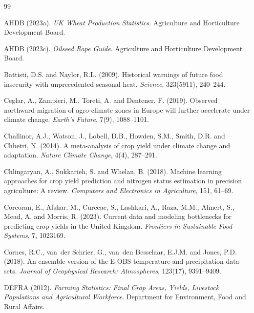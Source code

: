 \documentclass[12pt,a4paper]{report}
\begin{document}
\begin{thebibliography}{99}

AHDB (2023a).
\newblock \emph{UK Wheat Production Statistics}.
\newblock Agriculture and Horticulture Development Board.

AHDB (2023c).
\newblock \emph{Oilseed Rape Guide}.
\newblock Agriculture and Horticulture Development Board.

Battisti, D.S. and Naylor, R.L. (2009).
\newblock Historical warnings of future food insecurity with unprecedented seasonal heat.
\newblock \emph{Science}, 323(5911), 240--244.

Ceglar, A., Zampieri, M., Toreti, A. and Dentener, F. (2019).
\newblock Observed northward migration of agro-climate zones in Europe will further accelerate under climate change.
\newblock \emph{Earth's Future}, 7(9), 1088--1101.

Challinor, A.J., Watson, J., Lobell, D.B., Howden, S.M., Smith, D.R. and Chhetri, N. (2014).
\newblock A meta-analysis of crop yield under climate change and adaptation.
\newblock \emph{Nature Climate Change}, 4(4), 287--291.

Chlingaryan, A., Sukkarieh, S. and Whelan, B. (2018).
\newblock Machine learning approaches for crop yield prediction and nitrogen status estimation in precision agriculture: A review.
\newblock \emph{Computers and Electronics in Agriculture}, 151, 61--69.

Corcoran, E., Afshar, M., Curceac, S., Lashkari, A., Raza, M.M., Ahnert, S., Mead, A. and Morris, R. (2023).
\newblock Current data and modeling bottlenecks for predicting crop yields in the United Kingdom.
\newblock \emph{Frontiers in Sustainable Food Systems}, 7, 1023169.

Cornes, R.C., van~der Schrier, G., van~den Besselaar, E.J.M. and Jones, P.D. (2018).
\newblock An ensemble version of the E-OBS temperature and precipitation data sets.
\newblock \emph{Journal of Geophysical Research: Atmospheres}, 123(17), 9391--9409.

DEFRA (2012).
\newblock \emph{Farming Statistics: Final Crop Areas, Yields, Livestock Populations and Agricultural Workforce}.
\newblock Department for Environment, Food and Rural Affairs.


\end{thebibliography}
\end{document}
